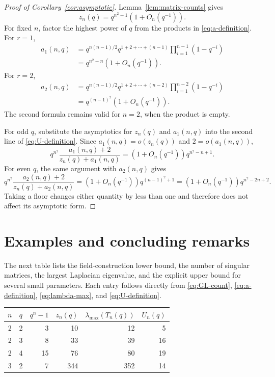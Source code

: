 \documentclass[11pt]{article}
\theoremstyle{definition}
\begin{document}
\begin{proof}[Proof of Corollary~\ref{cor:asymptotic}]
Lemma~\ref{lem:matrix-counts} gives
\[
  z_n(q)=q^{n^2-1}(1+O_n(q^{-1})).
\]
For fixed $n$, factor the highest power of $q$ from the products in
\eqref{eq:a-definition}.  For $r=1$,
\begin{align*}
 a_1(n,q)
 &=q^{n(n-1)/2}
   q^{1+2+\cdots+(n-1)}
   \prod_{i=1}^{n-1}(1-q^{-i})\\
 &=q^{n^2-n}(1+O_n(q^{-1})).
\end{align*}
For $r=2$,
\begin{align*}
 a_2(n,q)
 &=q^{n(n-1)/2}
   q^{1+2+\cdots+(n-2)}
   \prod_{i=1}^{n-2}(1-q^{-i})\\
 &=q^{(n-1)^2}(1+O_n(q^{-1})).
\end{align*}
The second formula remains valid for $n=2$, when the product is empty.

For odd $q$, substitute the asymptotics for $z_n(q)$ and $a_1(n,q)$ into
the second line of \eqref{eq:U-definition}.  Since $a_1(n,q)=o(z_n(q))$
and $2=o(a_1(n,q))$,
\[
 q^{n^2}\frac{a_1(n,q)+2}{z_n(q)+a_1(n,q)}
 =(1+O_n(q^{-1}))q^{n^2-n+1}.
\]
For even $q$, the same argument with $a_2(n,q)$ gives
\[
 q^{n^2}\frac{a_2(n,q)+2}{z_n(q)+a_2(n,q)}
 =(1+O_n(q^{-1}))q^{(n-1)^2+1}
 =(1+O_n(q^{-1}))q^{n^2-2n+2}.
\]
Taking a floor changes either quantity by less than one and therefore does
not affect its asymptotic form.
\end{proof}

\section{Examples and concluding remarks}\label{sec:examples}

The next table lists the field-construction lower bound, the number of
singular matrices, the largest Laplacian eigenvalue, and the explicit upper
bound for several small parameters.  Each entry follows directly from
\eqref{eq:GL-count}, \eqref{eq:a-definition}, \eqref{eq:lambda-max}, and
\eqref{eq:U-definition}.

\begin{center}
\begin{tabular}{ccrrrr}
\toprule
$n$&$q$&$q^n-1$&$z_n(q)$&$\lambda_{\max}(T_n(q))$&$U_n(q)$\\
\midrule
2&2&3&10&12&5\\
2&3&8&33&39&16\\
2&4&15&76&80&19\\
3&2&7&344&352&14\\
\bottomrule
\end{tabular}
\end{center}
\end{document}
